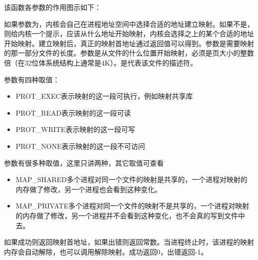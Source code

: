 

该函数各参数的作用图示如下：




如果参数为，内核会自己在进程地址空间中选择合适的地址建立映射。如果不是，则给内核一个提示，应该从什么地址开始映射，内核会选择之上的某个合适的地址开始映射。建立映射后，真正的映射首地址通过返回值可以得到。参数是需要映射的那一部分文件的长度。参数是从文件的什么位置开始映射，必须是页大小的整数倍（在32位体系统结构上通常是4K）。是代表该文件的描述符。



参数有四种取值：


\begin{itemize}

\item PROT\_\BookSplit{}EXEC表示映射的这一段可执行，例如映射共享库

\item PROT\_\BookSplit{}READ表示映射的这一段可读

\item PROT\_\BookSplit{}WRITE表示映射的这一段可写

\item PROT\_\BookSplit{}NONE表示映射的这一段不可访问
\end{itemize}


参数有很多种取值，这里只讲两种，其它取值可查看


\begin{itemize}

\item MAP\_\BookSplit{}SHARED多个进程对同一个文件的映射是共享的，一个进程对映射的内存做了修改，另一个进程也会看到这种变化。

\item MAP\_\BookSplit{}PRIVATE多个进程对同一个文件的映射不是共享的，一个进程对映射的内存做了修改，另一个进程并不会看到这种变化，也不会真的写到文件中去。
\end{itemize}


如果成功则返回映射首地址，如果出错则返回常数。当进程终止时，该进程的映射内存会自动解除，也可以调用解除映射。成功返回0，出错返回-1。



